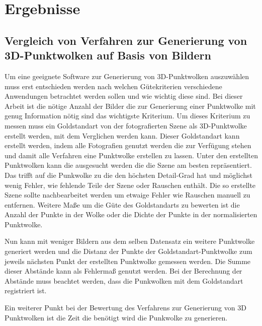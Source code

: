 \documentclass[12pt,titlepage, twoside]{article}
\begin{document}
\newpage
\section{Ergebnisse}
\label{sec:ergebnisse}
%

\subsection{Vergleich von Verfahren zur Generierung von 3D-Punktwolken auf Basis von Bildern}

Um eine geeignete Software zur Generierung von 3D-Punktwolken auszuwählen muss erst entschieden werden nach welchen Gütekriterien verschiedene Anwendungen betrachtet werden sollen und wie wichtig diese sind.
Bei dieser Arbeit ist die nötige Anzahl der Bilder die zur Generierung einer Punktwolke mit genug Information nötig sind das wichtigste Kriterium. 
Um dieses Kriterium zu messen muss ein Goldstandart von der fotografierten Szene als 3D-Punktwolke erstellt werden, mit dem Verglichen werden kann.
Dieser Goldstandart kann erstellt werden, indem alle Fotografien genutzt werden die zur Verfügung stehen und damit alle Verfahren eine Punktwolke erstellen zu lassen. 
Unter den erstellten Punktwolken kann die ausgesucht werden die die Szene am besten repräsentiert. 
Das trifft auf die Punkwolke zu die den höchsten Detail-Grad hat und möglichst wenig Fehler, wie fehlende Teile der Szene oder Rauschen enthält.
Die so erstellte Szene sollte nachbearbeitet werden um etwaige Fehler wie Rauschen manuell zu entfernen.
Weitere Maße um die Güte des Goldstandarts zu bewerten ist die Anzahl der Punkte in der Wolke oder die Dichte der Punkte in der normalisierten Punktwolke.

Nun kann mit weniger Bildern aus dem selben Datensatz ein weitere Punktwolke generiert werden und die Distanz der Punkte der Goldstandart-Punktwolke zum jeweils nächsten Punkt der erstellten Punktwolke gemessen werden.
Die Summe dieser Abstände kann als Fehlermaß genutzt werden. Bei der Berechnung der Abstände muss beachtet werden, dass die Punkwolken mit dem Goldstandart registriert ist.

Ein weiterer Punkt bei der Bewertung des Verfahrens zur Generierung von 3D Punktwolken ist die Zeit die benötigt wird die Punkwolke zu generieren.
\end{document}
